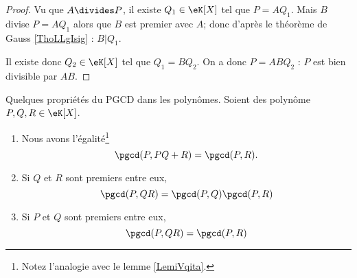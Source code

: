 \begin{proof}
    Vu que \( A\divides P\), il existe \( Q_1\in \eK[X]\) tel que \( P=AQ_1\). Mais \( B\) divise \( P=AQ_1\) alors que \( B\) est premier avec \( A\); donc d'après le théorème de Gauss \ref{ThoLLgIsig} : $B|Q_1$.

    Il existe donc $Q_2\in \eK[X]$ tel que $Q_1=BQ_2$. On a donc $P=ABQ_2$ : $P$ est bien divisible par $AB$.
\end{proof}

\begin{lemma}   \label{LemUELTuwK}
    Quelques propriétés du PGCD dans les polynômes. Soient des polynôme \( P,Q,R\in \eK[X]\).
    \begin{enumerate}
        \item       \label{ITEMooBPOZooYeFGjl}
            Nous avons l'égalité\footnote{Notez l'analogie avec le lemme \ref{LemiVqita}.}
            \begin{equation}
                \pgcd(P,PQ+R)=\pgcd(P,R).
            \end{equation}
        \item       \label{ITEMooUVGRooNSGDZn}
            Si \( Q \) et \( R\) sont premiers entre eux,
            \begin{equation}
                \pgcd(P,QR)=\pgcd(P,Q)\pgcd(P,R)
            \end{equation}
        \item       \label{ITEMooYXAHooXibkgV}
            Si \( P\) et \( Q\) sont premiers entre eux,
            \begin{equation}
                \pgcd(P,QR)=\pgcd(P,R)
            \end{equation}
    \end{enumerate}
\end{lemma}

